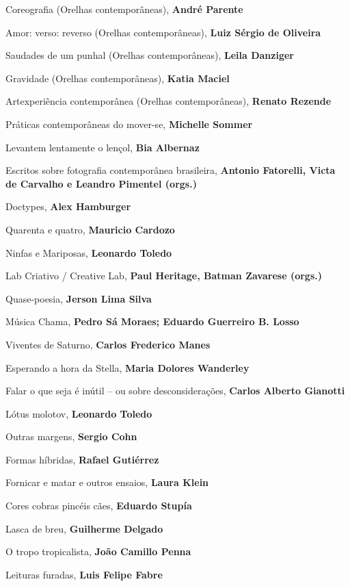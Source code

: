 \begin{multicols}{2}
\begin{enumerate}
{\item Coreografia (Orelhas contemporâneas), \textbf{André Parente}
\item Amor: verso: reverso (Orelhas contemporâneas), \textbf{Luiz Sérgio de Oliveira}
\item Saudades de um punhal (Orelhas contemporâneas), \textbf{Leila Danziger}
\item Gravidade (Orelhas contemporâneas), \textbf{Katia Maciel}
\item Artexperiência contemporânea (Orelhas contemporâneas), \textbf{Renato Rezende}
\item Práticas contemporâneas do mover-se, \textbf{Michelle Sommer}
\item Levantem lentamente o lençol, \textbf{Bia Albernaz}
\item Escritos sobre fotografia contemporânea brasileira, \textbf{Antonio Fatorelli, Victa de Carvalho e Leandro Pimentel (orgs.)}
\item Doctypes, \textbf{Alex Hamburger}
\item Quarenta e quatro, \textbf{Mauricio Cardozo}
\item Ninfas e Mariposas, \textbf{Leonardo Toledo}
\item Lab Criativo / Creative Lab, \textbf{Paul Heritage, Batman Zavarese (orgs.)}
\item Quase-poesia, \textbf{Jerson Lima Silva}
\item Música Chama, \textbf{Pedro Sá Moraes; Eduardo Guerreiro B. Losso}
\item Viventes de Saturno, \textbf{Carlos Frederico Manes}
\item Esperando a hora da Stella, \textbf{Maria Dolores Wanderley}
\item Falar o que seja é inútil – ou sobre desconsiderações, \textbf{Carlos Alberto Gianotti}
\item Lótus molotov, \textbf{Leonardo Toledo}
\item Outras margens, \textbf{Sergio Cohn}
\item Formas híbridas, \textbf{Rafael Gutiérrez}
\item Fornicar e matar e outros ensaios, \textbf{Laura Klein}
\item Cores cobras pincéis cães, \textbf{Eduardo Stupía}
\item Lasca de breu, \textbf{Guilherme Delgado}
\item O tropo tropicalista, \textbf{João Camillo Penna}
\item Leituras furadas, \textbf{Luis Felipe Fabre}
}
\end{enumerate}
\end{multicols}
